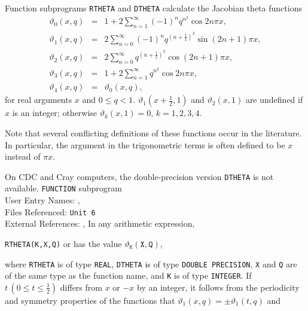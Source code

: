                      
                  
                
                      \Revised{}
Function subprograms {\tt RTHETA} and {\tt DTHETA} calculate the
Jacobian theta functions
$$ \begin{array}{rcl}
\vartheta_0(x,q) & = & 1 + 2 \displaystyle \sum_{n=1}^\infty
(-1)^n q^{n^2} \cos 2n \pi x, \\[6mm]
\vartheta_1(x,q) & = & 2 \displaystyle \sum_{n=0}^\infty
(-1)^n q^{{\left( n+\frac{1}{2} \right)}^2} \sin (2n+1) \pi x, \\[6mm]
\vartheta_2(x,q) & = & 2 \displaystyle \sum_{n=0}^\infty
q^{{\left( n+\frac{1}{2} \right)}^2} \cos (2n+1) \pi x, \\[6mm]
\vartheta_3(x,q) & = & 1 + 2 \displaystyle \sum_{n=1}^\infty
q^{n^2} \cos 2n \pi x, \\[6mm]
\vartheta_4(x,q) & = & \vartheta_0(x,q),
\end{array} $$
for real arguments $x$ and $0 \le q<1$. $\vartheta_1(x+\frac{1}{2},1)$
and $\vartheta_2(x,1)$ are undefined if $x$ is an integer; otherwise
$\vartheta_k(x,1)=0,\, k=1,2,3,4$.
\par
Note that several conflicting definitions of these functions occur in
the literature. In particular, the argument in the trigonometric terms
is often defined to be $x$ instead of $\pi x$.
\par
On CDC and Cray computers, the double-precision version {\tt DTHETA}
is not available.
\Structure
{\tt FUNCTION} subprogram \\
User Entry Names: ,  \\
Files Referenced: {\tt Unit 6} \\
External References: , 
\Usage
In any arithmetic expression,
\begin{center}
{\tt RTHETA(K,X,Q)} \quad or  \quad
has the value  \quad $\vartheta_{\mathtt{K}}(\mathtt{X,Q})$,
\end{center}
where {\tt RTHETA} is of type {\tt REAL}, {\tt DTHETA} is of type
{\tt DOUBLE PRECISION}, {\tt X} and {\tt Q} are of the same
type as the function name, and {\tt K} is of type {\tt INTEGER}.
\Method
If $t\,(0 \le t \le \frac{1}{2})$ differs from $x$ or $-x$ by an
integer, it follows from the periodicity and symmetry properties of the
functions that $\vartheta_1(x,q)=\pm \vartheta_1(t,q)$ and
